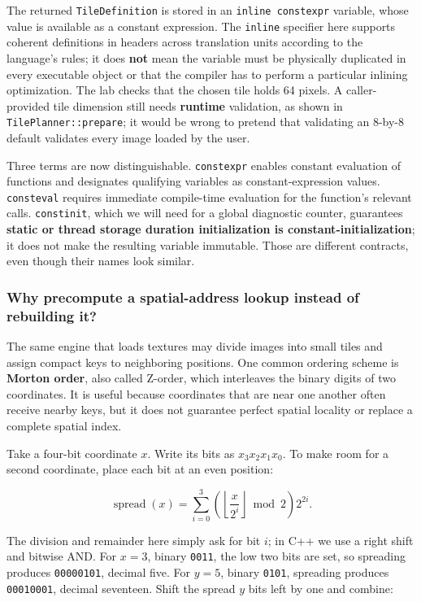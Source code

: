 The returned \texttt{TileDefinition} is stored in an \texttt{inline\ constexpr} variable, whose value is available as a constant expression. The \texttt{inline} specifier here supports coherent definitions in headers across translation units according to the language's rules; it does \textbf{not} mean the variable must be physically duplicated in every executable object or that the compiler has to perform a particular inlining optimization. The lab checks that the chosen tile holds 64 pixels. A caller-provided tile dimension still needs \textbf{runtime} validation, as shown in \texttt{TilePlanner::prepare}; it would be wrong to pretend that validating an 8-by-8 default validates every image loaded by the user.

Three terms are now distinguishable. \texttt{constexpr} enables constant evaluation of functions and designates qualifying variables as constant-expression values. \texttt{consteval} requires immediate compile-time evaluation for the function's relevant calls. \texttt{constinit}, which we will need for a global diagnostic counter, guarantees \textbf{static or thread storage duration initialization is constant-initialization}; it does not make the resulting variable immutable. Those are different contracts, even though their names look similar.

\subsubsection{Why precompute a spatial-address lookup instead of rebuilding it?}\label{why-precompute-a-spatial-address-lookup-instead-of-rebuilding-it}

The same engine that loads textures may divide images into small tiles and assign compact keys to neighboring positions. One common ordering scheme is \textbf{Morton order}, also called Z-order, which interleaves the binary digits of two coordinates. It is useful because coordinates that are near one another often receive nearby keys, but it does not guarantee perfect spatial locality or replace a complete spatial index.

Take a four-bit coordinate \(x\). Write its bits as \(x_3x_2x_1x_0\). To make room for a second coordinate, place each bit at an even position:

\[
\operatorname{spread}(x)
=\sum_{i=0}^{3} \left(\left\lfloor\frac{x}{2^i}\right\rfloor\bmod 2\right)2^{2i}.
\]

The division and remainder here simply ask for bit \(i\); in C++ we use a right shift and bitwise AND. For \(x=3\), binary \texttt{0011}, the low two bits are set, so spreading produces \texttt{00000101}, decimal five. For \(y=5\), binary \texttt{0101}, spreading produces \texttt{00010001}, decimal seventeen. Shift the spread \(y\) bits left by one and combine:

